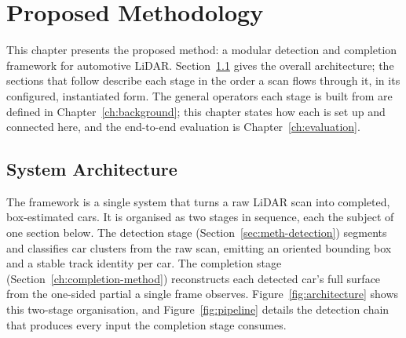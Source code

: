 %
%
\chapter{Proposed Methodology}
\label{ch:pipeline}

This chapter presents the proposed method: a modular detection and completion framework
for automotive LiDAR. Section~\ref{sec:meth-architecture} gives the overall architecture;
the sections that follow describe each stage in the order a scan flows through it, in its
configured, instantiated form. The general operators each stage is built from are defined
in Chapter~\ref{ch:background}; this chapter states how each is set up and connected here,
and the end-to-end evaluation is Chapter~\ref{ch:evaluation}.

\section{System Architecture}
\label{sec:meth-architecture}

The framework is a single system that turns a raw LiDAR scan into completed,
box-estimated cars. It is organised as two stages in sequence, each the subject of one
section below. The detection stage (Section~\ref{sec:meth-detection}) segments and
classifies car clusters from the raw scan, emitting an oriented bounding box and a stable
track identity per car. The completion stage (Section~\ref{ch:completion-method})
reconstructs each detected car's full surface from the one-sided partial a single frame
observes. Figure~\ref{fig:architecture} shows this two-stage organisation, and
Figure~\ref{fig:pipeline} details the detection chain that produces every input the
completion stage consumes.

